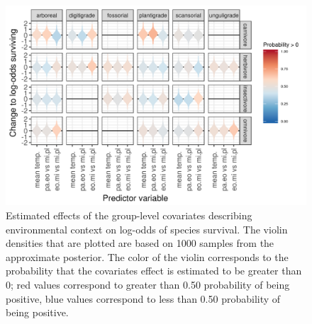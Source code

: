 \documentclass[12pt,letterpaper]{article}
\begin{document}
\begin{figure}[ht]
  \centering
  \includegraphics[width=\textwidth,height=0.4\textheight,keepaspectratio=true]{figure/group_on_survival_bd}
  \caption{Estimated effects of the group-level covariates describing environmental context on log-odds of species survival. The violin densities that are plotted are based on 1000 samples from the approximate posterior. The color of the violin corresponds to the probability that the covariates effect is estimated to be greater than 0; red values correspond to greater than 0.50 probability of being positive, blue values correspond to less than 0.50 probability of being positive.} 
  \label{fig:group_surv_bd}
\end{figure}
\end{document}
